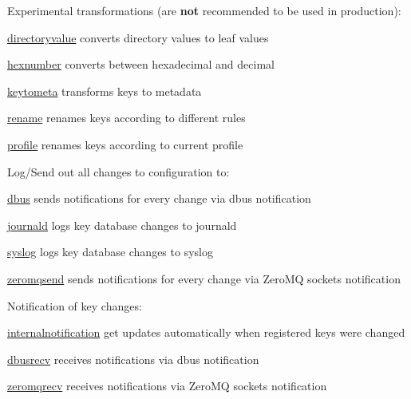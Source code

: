 Experimental transformations (are {\bfseries not} recommended to be used in production)\+:


\begin{DoxyItemize}
\item \hyperlink{autotoc_md173_src_plugins_directoryvalue_README_md}{directoryvalue} converts directory values to leaf values
\item \hyperlink{autotoc_md261_src_plugins_hexnumber_README_md}{hexnumber} converts between hexadecimal and decimal
\item \hyperlink{autotoc_md338_src_plugins_keytometa_README_md}{keytometa} transforms keys to metadata
\item \hyperlink{autotoc_md570_src_plugins_rename_README_md}{rename} renames keys according to different rules
\item \hyperlink{autotoc_md508_src_plugins_profile_README_md}{profile} renames keys according to current profile
\end{DoxyItemize}

Log/\+Send out all changes to configuration to\+:


\begin{DoxyItemize}
\item \hyperlink{autotoc_md153_src_plugins_dbus_README_md}{dbus} sends notifications for every change via dbus {\ttfamily notification}
\item \hyperlink{autotoc_md319_src_plugins_journald_README_md}{journald} logs key database changes to journald
\item \hyperlink{autotoc_md633_src_plugins_syslog_README_md}{syslog} logs key database changes to syslog
\item \hyperlink{autotoc_md906_src_plugins_zeromqsend_README_md}{zeromqsend} sends notifications for every change via Zero\+MQ sockets {\ttfamily notification}
\end{DoxyItemize}

Notification of key changes\+:


\begin{DoxyItemize}
\item \hyperlink{autotoc_md289_src_plugins_internalnotification_README_md}{internalnotification} get updates automatically when registered keys were changed
\item \hyperlink{autotoc_md166_src_plugins_dbusrecv_README_md}{dbusrecv} receives notifications via dbus {\ttfamily notification}
\item \hyperlink{autotoc_md900_src_plugins_zeromqrecv_README_md}{zeromqrecv} receives notifications via Zero\+MQ sockets {\ttfamily notification}
\end{DoxyItemize}

